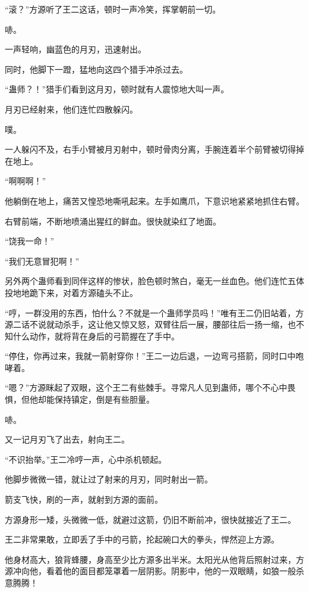 
\begin{this_body}

“滚？”方源听了王二这话，顿时一声冷笑，挥掌朝前一切。

哧。

一声轻响，幽蓝色的月刃，迅速射出。

同时，他脚下一蹬，猛地向这四个猎手冲杀过去。

“蛊师？！”猎手们看到这月刃，顿时就有人震惊地大叫一声。

月刃已经射来，他们连忙四散躲闪。

噗。

一人躲闪不及，右手小臂被月刃射中，顿时骨肉分离，手腕连着半个前臂被切得掉在地上。

“啊啊啊！”

他躺倒在地上，痛苦又惶恐地嘶吼起来。左手如鹰爪，下意识地紧紧地抓住右臂。

右臂前端，不断地喷涌出猩红的鲜血。很快就染红了地面。

“饶我一命！”

“我们无意冒犯啊！”

另外两个蛊师看到同伴这样的惨状，脸色顿时煞白，毫无一丝血色。他们连忙五体投地地跪下来，对着方源磕头不止。

“哼，一群没用的东西，怕什么？不就是一个蛊师学员吗！”唯有王二仍旧站着，方源二话不说就动杀手，这让他又惊又怒，双臂往后一展，腰部往后一扬一缩，也不知什么动作，就将背在身后的弓箭握在了手中。

“停住，你再过来，我就一箭射穿你！”王二一边后退，一边弯弓搭箭，同时口中咆哮着。

“嗯？”方源眯起了双眼，这个王二有些棘手。寻常凡人见到蛊师，哪个不心中畏惧，但他却能保持镇定，倒是有些胆量。

哧。

又一记月刃飞了出去，射向王二。

“不识抬举。”王二冷哼一声，心中杀机顿起。

他脚步微微一错，就让过了射来的月刃，同时射出一箭。

箭支飞快，刷的一声，就射到方源的面前。

方源身形一矮，头微微一低，就避过这箭，仍旧不断前冲，很快就接近了王二。

王二非常果敢，立即丢了手中的弓箭，抡起碗口大的拳头，悍然迎上方源。

他身材高大，狼背蜂腰，身高至少比方源多出半米。太阳光从他背后照射过来，方源冲向他，看着他的面目都笼罩着一层阴影。阴影中，他的一双眼睛，如狼一般杀意腾腾！


\end{this_body}
